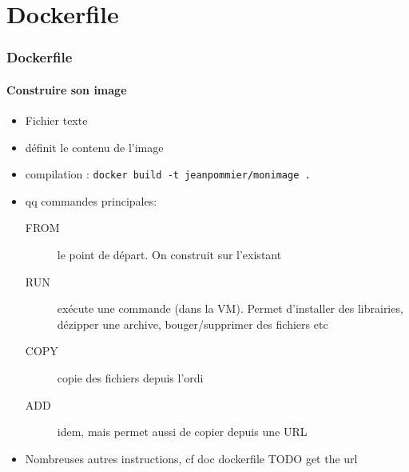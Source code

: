\documentclass[11pt]{beamer}
\begin{document}
\section{Dockerfile}

\begin{frame}[fragile]
\frametitle{Dockerfile}
\framesubtitle{Construire son image}
\begin{itemize}
	\item Fichier texte
	\item définit le contenu de l'image
	\item compilation : \verb|docker build -t jeanpommier/monimage .|
	\item qq commandes principales:
	\begin{description}
		\item[FROM] le point de départ. On construit sur l'existant
		\item[RUN]  exécute une commande (dans la VM). Permet d'installer des librairies, dézipper une archive, bouger/supprimer des fichiers etc
		\item[COPY] copie des fichiers depuis l'ordi
		\item[ADD]  idem, mais permet aussi de copier depuis une URL
		
	\end{description}
	\item[]		Nombreuses autres instructions, cf doc dockerfile TODO get the url
\end{itemize}
\end{frame}
\end{document}
